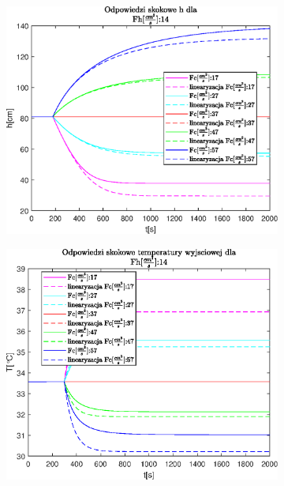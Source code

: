 \begin{figure}[h!]
   \centering
   \begin{subfigure}[b]{0.6\textwidth}
      \includegraphics[width=1\linewidth]{img/step-responses/stepResponseHFh14.eps}
      \caption{}
      \label{fig:fig:stepResponsesFh141}
   \end{subfigure}
       
   \begin{subfigure}[b]{0.6\textwidth}
      \includegraphics[width=1\linewidth]{img/step-responses/stepResponseToutFh14.eps}
      \caption{}
      \label{fig:fig:stepResponsesFh142}
   \end{subfigure}
       

\end{figure}
